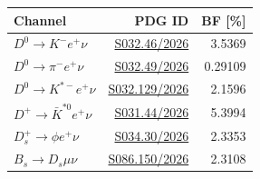 \begin{tabular}{lrr}
\toprule
Channel & PDG ID & BF [\%] \\
\midrule
$D^0\to K^-e^+\nu$ & \href{https://pdglive.lbl.gov/BranchingRatio.action?desig=S032.46}{S032.46/2026} & 3.5369 \\
$D^0\to\pi^-e^+\nu$ & \href{https://pdglive.lbl.gov/BranchingRatio.action?desig=S032.49}{S032.49/2026} & 0.29109 \\
$D^0\to K^{*-}e^+\nu$ & \href{https://pdglive.lbl.gov/BranchingRatio.action?desig=S032.129}{S032.129/2026} & 2.1596 \\
$D^+\to\bar K^{*0}e^+\nu$ & \href{https://pdglive.lbl.gov/BranchingRatio.action?desig=S031.44}{S031.44/2026} & 5.3994 \\
$D_s^+\to\phi e^+\nu$ & \href{https://pdglive.lbl.gov/BranchingRatio.action?desig=S034.30}{S034.30/2026} & 2.3353 \\
$B_s\to D_s\mu\nu$ & \href{https://pdglive.lbl.gov/BranchingRatio.action?desig=S086.150}{S086.150/2026} & 2.3108 \\
\bottomrule
\end{tabular}
